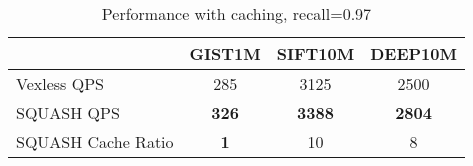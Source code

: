 \begin{table}[h]
\centering
\caption{Performance with caching, recall=0.97}
\begin{tabular}{|l|c|c|c|}
    \hline
     & \textbf{GIST1M} & \textbf{SIFT10M} & \textbf{DEEP10M} \\ \hline
     Vexless\cite{Su2024Vexless} QPS & 285 & 3125 & 2500 \\ \hline
     SQUASH QPS & \textbf{326} & \textbf{3388} & \textbf{2804} \\ \hline
     SQUASH Cache Ratio & \textbf{1} & 10 & 8 \\ \hline
\end{tabular}
\label{tab:caching-performance}
\end{table}
